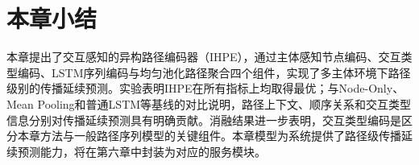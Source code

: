 \section{本章小结}

本章提出了交互感知的异构路径编码器（IHPE），通过主体感知节点编码、交互类型编码、LSTM序列编码与均匀池化路径聚合四个组件，实现了多主体环境下路径级别的传播延续预测。实验表明IHPE在所有指标上均取得最优；与Node-Only、Mean Pooling和普通LSTM等基线的对比说明，路径上下文、顺序关系和交互类型信息分别对传播延续预测具有明确贡献。消融结果进一步表明，交互类型编码是区分本章方法与一般路径序列模型的关键组件。本章模型为系统提供了路径级传播延续预测能力，将在第六章中封装为对应的服务模块。

